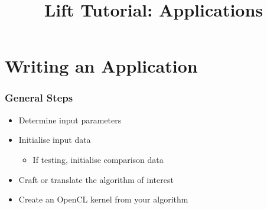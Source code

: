 \documentclass[10pt]{beamer}
\title{Lift Tutorial: Applications}
\date{}
\begin{document}
\begin{frame}
\maketitle
\end{frame}

\section{Writing an Application}

\begin{frame}
\frametitle{General Steps}
\begin{itemize}
    \item Determine input parameters 
    \item Initialise input data 
            \begin{itemize}
                \item If testing, initialise comparison data 
            \end{itemize}
    \item Craft or translate the algorithm of interest 
    \item Create an OpenCL kernel from your algorithm 
\end{itemize}
\end{frame}
\end{document}
